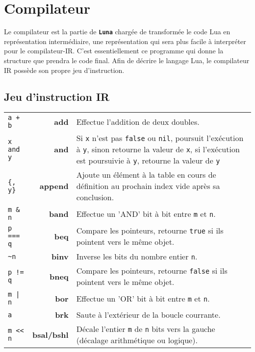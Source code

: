 \documentclass{article}
\newcommand{\luna}{\textbf{\texttt{Luna}}}
\begin{document}
\newpage
\section{Compilateur}
Le compilateur est la partie de \luna{} chargée de transformée le code Lua en représentation intermédiaire, une représentation qui sera plus facile à interpréter pour le compilateur-IR. C'est essentiellement ce programme qui donne la structure que prendra le code final. Afin de décrire le langage Lua, le compilateur IR possède son propre jeu d'instruction.
\subsection{Jeu d'instruction IR}
\label{par:subsection}
\begin{longtable}{p{2cm} r p{12cm}}
  {\lstinline$a + b$} & \textbf{add} & Effectue l'addition de deux doubles.\\
  {\lstinline$x and y$} & \textbf{and} & Si \texttt{x} n'est pas {\lstset{style=lua}\lstinline$false$} ou {\lstset{style=lua}\lstinline$nil$}, poursuit l'exécution à \texttt{y}, sinon retourne la valeur de \texttt{x}, si l'exécution est poursuivie à \texttt{y}, retourne la valeur de \texttt{y}\\
  {\lstset{style=lua}\lstinline${, y}$} & \textbf{append} & Ajoute un élément à la table en cours de définition au prochain index vide après sa conclusion.\\
  {\lstinline$m & n$} & \textbf{band} & Effectue un 'AND' bit à bit entre \texttt{m} et \texttt{n}.\\
  {\lstinline$p === q$} & \textbf{beq} & Compare les pointeurs, retourne {\lstset{style=lua}\lstinline$true$} si ils pointent vers le même objet.\\
  {\lstinline$~n$} & \textbf{binv} & Inverse les bits du nombre entier \texttt{n}.\\
  {\lstinline$p != q$} & \textbf{bneq} & Compare les pointeurs, retourne {\lstset{style=lua}\lstinline$false$} si ils pointent vers le même objet.\\
  {\lstinline$m | n$} & \textbf{bor} & Effectue un 'OR' bit à bit entre \texttt{m} et \texttt{n}.\\
  {\lstset{style=lua}\lstinline$a$} & \textbf{brk} & Saute à l'extérieur de la boucle courrante.\\
  {\lstinline$m << n$} & \textbf{bsal/bshl} &  Décale l'entier \texttt{m} de \texttt{n} bits vers la gauche (décalage arithmétique ou logique).\\

\end{longtable}
\end{document}

